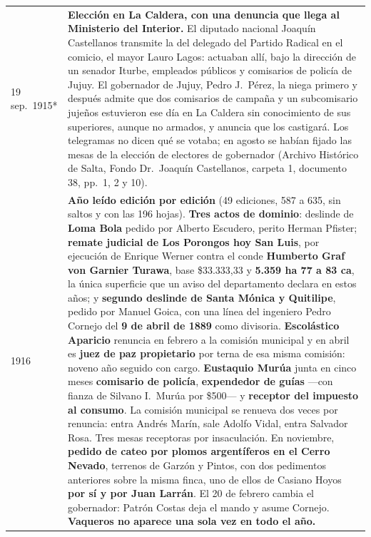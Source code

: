 \begin{longtable}{@{}p{2.7cm}p{10.3cm}@{}}
19 sep.\ 1915* & \textbf{Elección en La Caldera, con una denuncia que llega al Ministerio del Interior.} El diputado nacional Joaquín Castellanos transmite la del delegado del Partido Radical en el comicio, el mayor Lauro Lagos: actuaban allí, bajo la dirección de un senador Iturbe, empleados públicos y comisarios de policía de Jujuy. El gobernador de Jujuy, Pedro J.\ Pérez, la niega primero y después admite que dos comisarios de campaña y un subcomisario jujeños estuvieron ese día en La Caldera sin conocimiento de sus superiores, aunque no armados, y anuncia que los castigará. Los telegramas no dicen qué se votaba; en agosto se habían fijado las mesas de la elección de electores de gobernador (Archivo Histórico de Salta, Fondo Dr.\ Joaquín Castellanos, carpeta 1, documento 38, pp.\ 1, 2 y 10). \\
1916 & \textbf{Año leído edición por edición} (49 ediciones, 587 a 635, sin saltos y con las 196 hojas). \textbf{Tres actos de dominio}: deslinde de \textbf{Loma Bola} pedido por Alberto Escudero, perito Herman Pfister\index{Pfister, Hermann}; \textbf{remate judicial de Los Porongos hoy San Luis}, por ejecución de Enrique Werner contra el conde \textbf{Humberto Graf von Garnier Turawa}, base \$33.333,33 y \textbf{5.359 ha 77 a 83 ca}, la única superficie que un aviso del departamento declara en estos años; y \textbf{segundo deslinde de Santa Mónica y Quitilipe}, pedido por Manuel Goica, con una línea del ingeniero Pedro Cornejo del \textbf{9 de abril de 1889} como divisoria. \textbf{Escolástico Aparicio}\index{Aparicio, Escolástico M.} renuncia en febrero a la comisión municipal y en abril es \textbf{juez de paz propietario} por terna de esa misma comisión: noveno año seguido con cargo. \textbf{Eustaquio Murúa}\index{Murúa, Eustaquio} junta en cinco meses \textbf{comisario de policía}, \textbf{expendedor de guías} ---con fianza de Silvano I.\ Murúa\index{Murúa, Silvano Ignacio} por \$500--- y \textbf{receptor del impuesto al consumo}. La comisión municipal se renueva dos veces por renuncia: entra Andrés Marín, sale Adolfo Vidal, entra Salvador Rosa\index{Rosa, Salvador}. Tres mesas receptoras por insaculación. En noviembre, \textbf{pedido de cateo por plomos argentíferos en el Cerro Nevado}, terrenos de Garzón y Pintos, con dos pedimentos anteriores sobre la misma finca, uno de ellos de Casiano Hoyos \textbf{por sí y por Juan Larrán}\index{Larrán, Juan}. El 20 de febrero cambia el gobernador: Patrón Costas deja el mando y asume Cornejo. \textbf{Vaqueros no aparece una sola vez en todo el año.} \\

\end{longtable}
